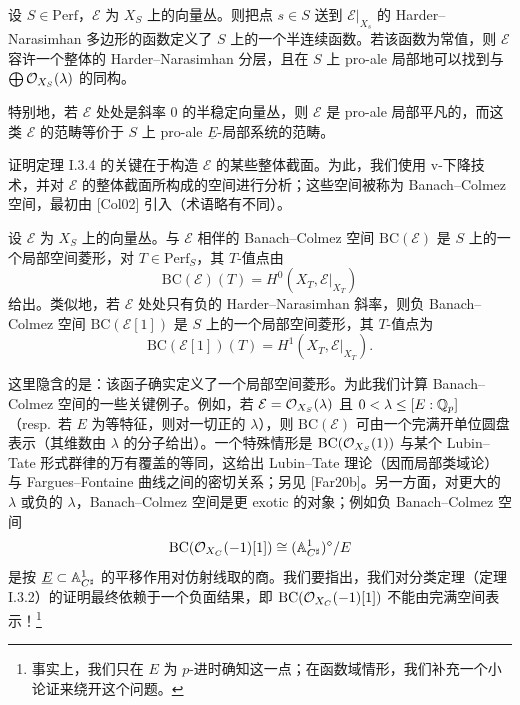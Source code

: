 \begin{theorem}%
设 $S\in\mathrm{Perf}$，$\mathcal{E}$ 为 $X_S$ 上的向量丛。则把点 $s\in S$ 送到 $\mathcal{E}|_{X_s}$ 的 Harder–Narasimhan 多边形的函数定义了 $S$ 上的一个半连续函数。若该函数为常值，则 $\mathcal{E}$ 容许一个整体的 Harder–Narasimhan 分层，且在 $S$ 上 pro-ale 局部地可以找到与 $\bigoplus\mathcal{O}_{X_S}(\lambda)$ 的同构。

特别地，若 $\mathcal{E}$ 处处是斜率 $0$ 的半稳定向量丛，则 $\mathcal{E}$ 是 pro-ale 局部平凡的，而这类 $\mathcal{E}$ 的范畴等价于 $S$ 上 pro-ale $\underline{E}$-局部系统的范畴。
\end{theorem}

证明定理 I.3.4 的关键在于构造 $\mathcal{E}$ 的某些整体截面。为此，我们使用 v-下降技术，并对 $\mathcal{E}$ 的整体截面所构成的空间进行分析；这些空间被称为 Banach–Colmez 空间，最初由 [Col02] 引入（术语略有不同）。

\begin{definition}%
设 $\mathcal{E}$ 为 $X_S$ 上的向量丛。与 $\mathcal{E}$ 相伴的 Banach–Colmez 空间 $\mathrm{BC}(\mathcal{E})$ 是 $S$ 上的一个局部空间菱形，对 $T\in\mathrm{Perf}_S$，其 $T$-值点由
\[
  \mathrm{BC}(\mathcal{E})(T) = H^0(X_T,\mathcal{E}|_{X_T})
\]
给出。类似地，若 $\mathcal{E}$ 处处只有负的 Harder–Narasimhan 斜率，则负 Banach–Colmez 空间 $\mathrm{BC}(\mathcal{E}[1])$ 是 $S$ 上的一个局部空间菱形，其 $T$-值点为
\[
  \mathrm{BC}(\mathcal{E}[1])(T) = H^1(X_T,\mathcal{E}|_{X_T}).
\]
\end{definition}

这里隐含的是：该函子确实定义了一个局部空间菱形。为此我们计算 Banach–Colmez 空间的一些关键例子。例如，若 $\mathcal{E}=\mathcal{O}_{X_S}(\lambda)$ 且 $0<\lambda\le[E:\mathbb{Q}_p]$（resp.\ 若 $E$ 为等特征，则对一切正的 $\lambda$），则 $\mathrm{BC}(\mathcal{E})$ 可由一个完满开单位圆盘表示（其维数由 $\lambda$ 的分子给出）。一个特殊情形是 $\mathrm{BC}(\mathcal{O}_{X_S}(1))$ 与某个 Lubin–Tate 形式群律的万有覆盖的等同，这给出 Lubin–Tate 理论（因而局部类域论）与 Fargues–Fontaine 曲线之间的密切关系；另见 [Far20b]。另一方面，对更大的 $\lambda$ 或负的 $\lambda$，Banach–Colmez 空间是更 exotic 的对象；例如负 Banach–Colmez 空间
\[
  \mathrm{BC}(\mathcal{O}_{X_C}(-1)[1])\cong(\mathbb{A}^1_{C^\sharp})^\diamond/E
\]
是按 $\underline{E}\subset\mathbb{A}^1_{C^\sharp}$ 的平移作用对仿射线取的商。我们要指出，我们对分类定理（定理 I.3.2）的证明最终依赖于一个负面结果，即 $\mathrm{BC}(\mathcal{O}_{X_C}(-1)[1])$ 不能由完满空间表示！\footnote{事实上，我们只在 $E$ 为 $p$-进时确知这一点；在函数域情形，我们补充一个小论证来绕开这个问题。}


